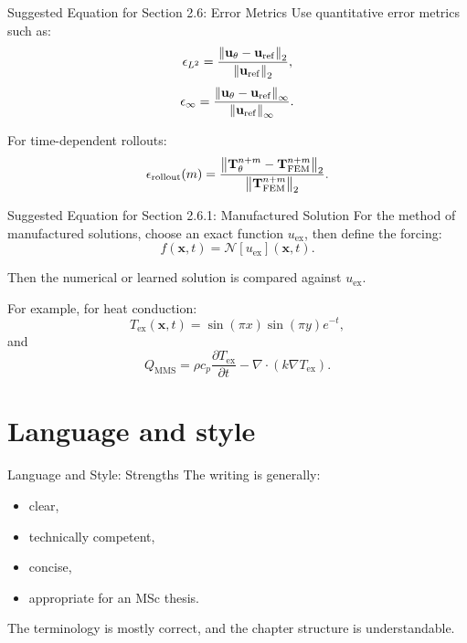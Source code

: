 \documentclass[aspectratio=169]{beamer}
\begin{document}
\begin{frame}{Suggested Equation for Section 2.6: Error Metrics}
Use quantitative error metrics such as:
\[
\epsilon_{L^2}
=
\frac{
\norm{\mathbf{u}_\theta-\mathbf{u}_{\mathrm{ref}}}_2
}{
\norm{\mathbf{u}_{\mathrm{ref}}}_2
},
\]
\[
\epsilon_{\infty}
=
\frac{
\norm{\mathbf{u}_\theta-\mathbf{u}_{\mathrm{ref}}}_\infty
}{
\norm{\mathbf{u}_{\mathrm{ref}}}_\infty
}.
\]

For time-dependent rollouts:
\[
\epsilon_{\mathrm{rollout}}(m)
=
\frac{
\norm{\mathbf{T}_\theta^{n+m}-\mathbf{T}_{\mathrm{FEM}}^{n+m}}_2
}{
\norm{\mathbf{T}_{\mathrm{FEM}}^{n+m}}_2
}.
\]
\end{frame}

\begin{frame}{Suggested Equation for Section 2.6.1: Manufactured Solution}
For the method of manufactured solutions, choose an exact function \(u_{\mathrm{ex}}\), then define the forcing:
\[
f(\mathbf{x},t)
=
\mathcal{N}[u_{\mathrm{ex}}](\mathbf{x},t).
\]

Then the numerical or learned solution is compared against \(u_{\mathrm{ex}}\).

For example, for heat conduction:
\[
T_{\mathrm{ex}}(\mathbf{x},t)
=
\sin(\pi x)\sin(\pi y)e^{-t},
\]
and
\[
Q_{\mathrm{MMS}}
=
\rho c_p \frac{\partial T_{\mathrm{ex}}}{\partial t}
-
\nabla\cdot(k\nabla T_{\mathrm{ex}}).
\]
\end{frame}

\section{Language and style}

\begin{frame}{Language and Style: Strengths}
The writing is generally:
\begin{itemize}
    \item clear,
    \item technically competent,
    \item concise,
    \item appropriate for an MSc thesis.
\end{itemize}

\medskip

The terminology is mostly correct, and the chapter structure is understandable.
\end{frame}
\end{document}
